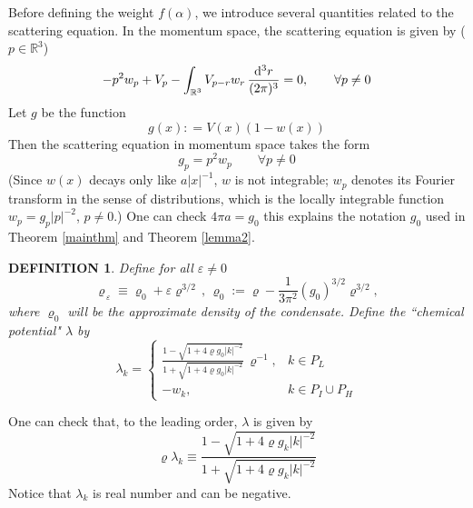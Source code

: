 \documentclass[11pt]{article}
\numberwithin{equation}{section}
\newcommand{\rd}{{\rm d}}
\newcommand{\beq}{\begin{equation}}
\newcommand{\eeq}{\end{equation}}
\newcommand\R{{\mathbb R}}
\newcommand\eps{\varepsilon}
\newcommand\rhop{\rho_{\,\eps}}
\renewcommand\rho\varrho
\newtheorem{mydef}{DEFINITION}[section]
\theoremstyle{definition}
\begin{document}
Before defining the weight $f(\alpha)$, we introduce several quantities related 
to the scattering equation. In the momentum space, the  scattering equation is 
given by ($p\in \R^3$)
%
\beq\label{av}
   -p^2 w_p+ V_p -\int_{\R^3} V_{p-r} w_r\,\frac{\rd^3 r}{(2\pi)^3}=0, \qquad \forall p \neq 0
\eeq 
 Let $g$ be the function 
\beq
     g(x): = V(x) (1- w(x))
\label{gdef}
\eeq
Then the scattering equation in momentum space takes the form
\beq\label{gp}
     g_p= p^2w_p  \qquad \forall p \neq 0
\eeq
(Since $w(x)$ decays only like $a|x|^{-1}$, $w$ is not integrable; $w_p$ denotes its Fourier transform
in the sense of distributions, which is the locally integrable function $w_p=g_p|p|^{-2}$, $p\neq 0$.)
One can check $ 4\pi a =g_0$  %
this explains the notation $g_{0}$ used in Theorem \ref{mainthm} and Theorem \ref{lemma2}. 




\begin{mydef}
Define  for all $ \eps\neq 0$
\beq\label{defrho0}
\rhop\equiv\rho_0+\eps\rho^{3/2}\, , \, \rho_0:= \rho-\frac{1}{3\pi^2}(g_0)^{3/2}\rho^{3/2}, 
\eeq
where  $\rho_0$ will be the approximate density of the condensate.
Define the ``chemical potential"   $\lambda$ by 
\beq\label{lambda}
\lambda_k= \left\{ 
\begin{array}{ll}
\frac{1-\sqrt{1+4\rho g_0|k|^{-2}}}{1+\sqrt{1+4\rho g_0|k|^{-2}}}\,\rho^{-1},& k\in P_L \\ 
-w_k, & k\in P_I\cup P_H
\end{array}\right.
\eeq
\end{mydef}
One can check that, to the leading order, $\lambda$ is given by 
\beq\label{lambda0}
\rho\lambda_k\equiv\frac{1-\sqrt{1+4\rho g_k|k|^{-2}}}{1+\sqrt{1+4\rho g_k|k|^{-2}}}
\eeq
Notice that $\lambda_k$ is real number and can be negative.
\end{document}
